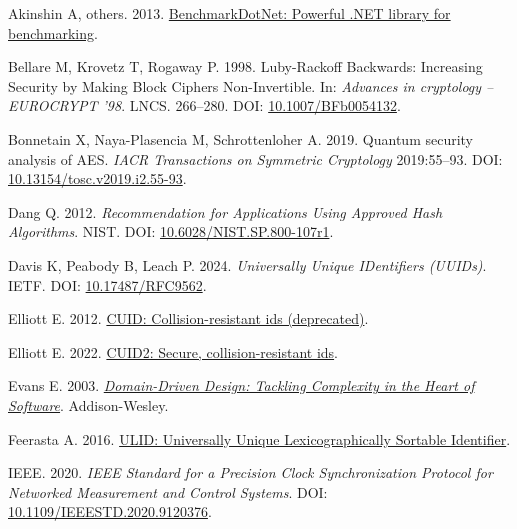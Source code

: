 \documentclass[fleqn,10pt]{wlpeerj}
\newlength{\cslhangindent}
\newenvironment{CSLReferences}[2]
 {\begin{list}{}{%
  \setlength{\itemindent}{0pt}
  \setlength{\leftmargin}{0pt}
  \setlength{\parsep}{0pt}
  \ifodd #1
   \setlength{\leftmargin}{\cslhangindent}
   \setlength{\itemindent}{-1\cslhangindent}
  \fi
  \setlength{\itemsep}{#2\baselineskip}}}
 {\end{list}}
\begin{document}
\protect{}\label{refs}
\begin{CSLReferences}{1}{0}
{Akinshin A, others}. 2013.
\href{https://github.com/dotnet/BenchmarkDotNet}{{BenchmarkDotNet:
Powerful .NET library for benchmarking}}.

Bellare M, Krovetz T, Rogaway P. 1998. {Luby-Rackoff Backwards:
Increasing Security by Making Block Ciphers Non-Invertible}. In:
\emph{Advances in cryptology -- EUROCRYPT '98}. LNCS. 266--280. DOI:
\href{https://doi.org/10.1007/BFb0054132}{10.1007/BFb0054132}.

Bonnetain X, Naya-Plasencia M, Schrottenloher A. 2019. Quantum security
analysis of {AES}. \emph{IACR Transactions on Symmetric Cryptology}
2019:55--93. DOI:
\href{https://doi.org/10.13154/tosc.v2019.i2.55-93}{10.13154/tosc.v2019.i2.55-93}.

Dang Q. 2012. \emph{{Recommendation for Applications Using Approved Hash
Algorithms}}. NIST. DOI:
\href{https://doi.org/10.6028/NIST.SP.800-107r1}{10.6028/NIST.SP.800-107r1}.

Davis K, Peabody B, Leach P. 2024. \emph{{Universally Unique IDentifiers
(UUIDs)}}. IETF. DOI:
\href{https://doi.org/10.17487/RFC9562}{10.17487/RFC9562}.

Elliott E. 2012. \href{https://github.com/paralleldrive/cuid}{{CUID:
Collision-resistant ids (deprecated)}}.

Elliott E. 2022. \href{https://github.com/paralleldrive/cuid2}{{CUID2:
Secure, collision-resistant ids}}.

Evans E. 2003.
\emph{\href{https://www.oreilly.com/library/view/domain-driven-design-tackling/0321125215/}{{Domain-Driven
Design: Tackling Complexity in the Heart of Software}}}. Addison-Wesley.

Feerasta A. 2016. \href{https://github.com/ulid/spec}{{ULID: Universally
Unique Lexicographically Sortable Identifier}}.

IEEE. 2020. \emph{{IEEE Standard for a Precision Clock Synchronization
Protocol for Networked Measurement and Control Systems}}. DOI:
\href{https://doi.org/10.1109/IEEESTD.2020.9120376}{10.1109/IEEESTD.2020.9120376}.


\end{CSLReferences}
\end{document}
